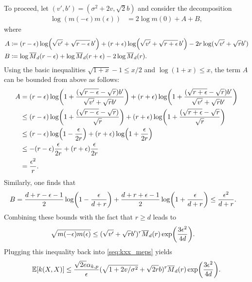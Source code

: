 \documentclass{article}
\theoremstyle{definition}
\newcommand{\ex}[1]{\ensuremath{\mathbb{E}\left[ #1\right]}}
\newcommand{\eps}{\epsilon}
\let\originalleft\left
\let\originalright\right
\renewcommand{\left}{\mathopen{}\mathclose\bgroup\originalleft}
\renewcommand{\right}{\aftergroup\egroup\originalright}
\begin{document}
To proceed, let $(v',b') = ( \sigma^2 + 2 v,  \sqrt{2}b)$ and consider the decomposition
\begin{align*}
 \log (m(-\eps)  m(\eps))  & = 2 \log m(0) + A + B ,
\end{align*}
where
\begin{align*}
A&\coloneqq (r - \eps)  \log    \left(  \sqrt{ v'} + \sqrt{r - \eps} \,  b'  \right) +  (r + \eps) \log   \left(  \sqrt{ v'} + \sqrt{r + \eps} \,  b'  \right) - 2r  \log( \sqrt{v'} + \sqrt{r} b')\\
B &\coloneqq  \log\overline{M}_{d}(r - \eps)   + \log \overline{M}_{d}(r + \eps)  - 2 \log \overline{M}_d(r).
\end{align*} 
Using the basic inequalities 
$\sqrt{1 + x} - 1 \le x/2$ and $\log(1+x) \le x$, the  term $A$ can be bounded from above as follows:
\begin{align*}
A & = (r - \eps)  \log    \left( 1 + \frac{( \sqrt{r - \eps}   -\sqrt{r})  b'}{ \sqrt{v'} + \sqrt{r} b'}   \right) +  (r + \eps)  \log    \left( 1 + \frac{ ( \sqrt{r  +  \eps}   -\sqrt{r} ) b'}{ \sqrt{v'} + \sqrt{r} b'}   \right)\\
& \le(r - \eps)  \log    \left( 1 + \frac{( \sqrt{r - \eps}   -\sqrt{r})  }{ \sqrt{r} }   \right) +  (r + \eps)  \log    \left( 1 + \frac{ ( \sqrt{r  +  \eps}   -\sqrt{r}  }{  \sqrt{r} }   \right)\\
& \le(r - \eps)  \log    \left( 1 - \frac{\eps  }{2r}   \right) +  (r + \eps)  \log    \left( 1 + \frac{ \eps  }{ 2r}   \right)\\
& \le - (r - \eps) \frac{\eps  }{2r}  +  (r + \eps)   \frac{ \eps  }{ 2r}  \\
&= \frac{ \eps^2}{r}.
\end{align*}
Similarly, one finds that
\begin{align*}
B &=  \frac{d + r - \eps -1}{2} \log\left( 1 - \frac{\eps}{ d + r} \right) +\frac{d + r + \eps -1}{2} \log\left( 1 + \frac{\eps}{ d + r} \right) \le \frac{ \eps^2}{ d + r} .
\end{align*}
Combining these bounds with the fact that $r \ge d$ leads to 
\begin{align*}
 \sqrt{m(-\eps)  m(\eps)}   & \le   ( \sqrt{v'} + \sqrt{r} b')^r \overline{M}_d(r) \exp\left(  \frac{ 3 \eps^2}{ 4 d}  \right) .
\end{align*} 
Plugging this inequality back into \eqref{seq:kxx_meps} yields
\begin{align}
\ex{ k(X,X) } \le  \frac{ \sqrt{2 e}  \alpha_{k,p}  }{ \eps}    ( \sqrt{1 + 2 v/ \sigma^2} + \sqrt{2r} b)^r \overline{M}_d(r) \exp\left(  \frac{ 3 \eps^2}{ 4 d}  \right). \label{seq:kxx_meps_b}
\end{align}
\end{document}
